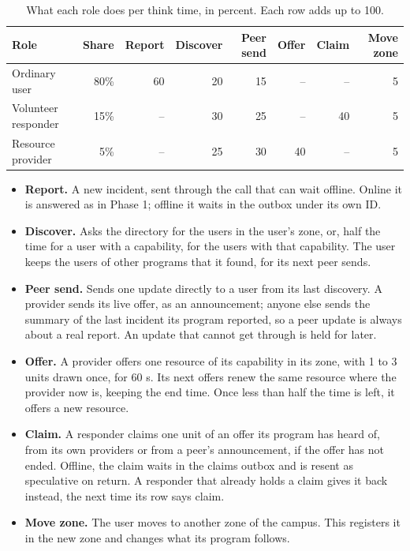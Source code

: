 \begin{table}[!htb]
\centering\small
\caption{What each role does per think time, in percent. Each row adds up to 100.}
\label{tab:actions}
\begin{tabular}{@{}lrrrrrrr@{}}
\toprule
Role & Share & Report & Discover & Peer send & Offer & Claim & Move zone \\
\midrule
Ordinary user & 80\% & 60 & 20 & 15 & -- & -- & 5 \\
Volunteer responder & 15\% & -- & 30 & 25 & -- & 40 & 5 \\
Resource provider & 5\% & -- & 25 & 30 & 40 & -- & 5 \\
\bottomrule
\end{tabular}
\end{table}

\begin{itemize}
  \item \textbf{Report.} A new incident, sent through the call that can wait offline. Online it is answered as in Phase 1; offline it waits in the outbox under its own ID.
  \item \textbf{Discover.} Asks the directory for the users in the user's zone, or, half the time for a user with a capability, for the users with that capability. The user keeps the users of other programs that it found, for its next peer sends.
  \item \textbf{Peer send.} Sends one update directly to a user from its last discovery. A provider sends its live offer, as an announcement; anyone else sends the summary of the last incident its program reported, so a peer update is always about a real report. An update that cannot get through is held for later.
  \item \textbf{Offer.} A provider offers one resource of its capability in its zone, with 1 to 3 units drawn once, for 60 s. Its next offers renew the same resource where the provider now is, keeping the end time. Once less than half the time is left, it offers a new resource.
  \item \textbf{Claim.} A responder claims one unit of an offer its program has heard of, from its own providers or from a peer's announcement, if the offer has not ended. Offline, the claim waits in the claims outbox and is resent as speculative on return. A responder that already holds a claim gives it back instead, the next time its row says claim.
  \item \textbf{Move zone.} The user moves to another zone of the campus. This registers it in the new zone and changes what its program follows.
\end{itemize}

